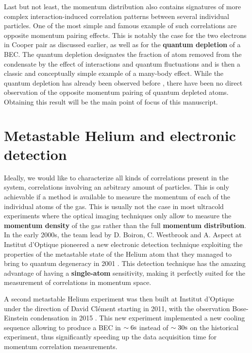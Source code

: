 Last but not least, the momentum distribution also contains signatures of more complex interaction-induced correlation patterns between several individual particles. One of the most simple and famous example of such correlations are opposite momentum pairing effects. This is notably the case for the two electrons in Cooper pair as discussed earlier, as well as for the \textbf{quantum depletion} of a BEC. The quantum depletion designates the fraction of atom removed from the condensate by the effect of interactions and quantum fluctuations and is then a classic and conceptually simple example of a many-body effect. While the quantum depletion has already been observed before \cite{chang2016,lopes2017,xu2006}, there have been no direct observation of the opposite momentum pairing of quantum depleted atoms. Obtaining this result will be the main point of focus of this manuscript.

\section*{Metastable Helium and electronic detection}

Ideally, we would like to characterize all kinds of correlations present in the system, \ie correlations involving an arbitrary amount of particles. This is only achievable if a method is available to measure the momentum of each of the individual atoms of the gas. This is usually not the case in most ultracold experiments where the optical imaging techniques only allow to measure the \textbf{momentum density} of the gas rather than the full \textbf{momentum distribution}. In the early 2000s, the team lead by D. Boiron, C. Westbrook and A. Aspect at Institut d'Optique pioneered a new electronic detection technique exploiting the properties of the metastable state of the Helium atom that they managed to bring to quantum degeneracy in 2001 \cite{robert2001bose}. This detection technique has the amazing advantage of having a \textbf{single-atom} sensitivity, making it perfectly suited for the measurement of correlations in momentum space.

A second metastable Helium experiment was then built at Institut d'Optique under the direction of David Clément starting in 2011, with the observation Bose-Einstein condensation in 2015 \cite{bouton2015fast}. This new experiment implemented a new cooling sequence allowing to produce a BEC in $\sim 6\rm{s}$ instead of $\sim 30\rm{s}$ on the historical experiment, thus significantly speeding up the data acquisition time for momentum correlation measurements.

